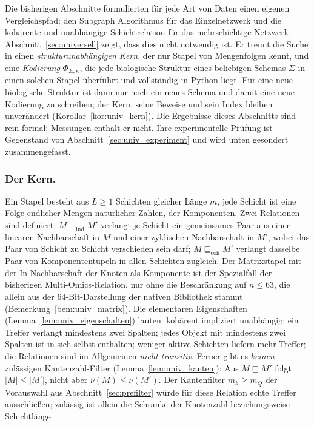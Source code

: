 \documentclass[a4paper,12pt, twoside]{report}
\theoremstyle{definition}
\begin{document}
Die bisherigen Abschnitte formulierten für jede Art von Daten einen eigenen Vergleichspfad: den Subgraph Algorithmus für das Einzelnetzwerk und die kohärente und unabhängige Schichtrelation für das mehrschichtige Netzwerk. Abschnitt~\ref{sec:universell} zeigt, dass dies nicht notwendig ist. Er trennt die Suche in einen \emph{strukturunabhängigen Kern}, der nur Stapel von Mengenfolgen kennt, und eine \emph{Kodierung} $\Phi_{\Sigma,\kappa}$, die jede biologische Struktur eines beliebigen Schemas $\Sigma$ in einen solchen Stapel überführt und vollständig in Python liegt. Für eine neue biologische Struktur ist dann nur noch ein neues Schema und damit eine neue Kodierung zu schreiben; der Kern, seine Beweise und sein Index bleiben unverändert (Korollar~\ref{kor:univ_kern}). Die Ergebnisse dieses Abschnitts sind rein formal; Messungen enthält er nicht. Ihre experimentelle Prüfung ist Gegenstand von Abschnitt~\ref{sec:univ_experiment} und wird unten gesondert zusammengefasst.

\subsubsection{Der Kern.} Ein Stapel besteht aus $L\ge1$ Schichten gleicher Länge $m$, jede Schicht ist eine Folge endlicher Mengen natürlicher Zahlen, der Komponenten. Zwei Relationen sind definiert: $M\sqsubseteq_{\mathrm{ind}}M'$ verlangt je Schicht ein gemeinsames Paar aus einer linearen Nachbarschaft in $M$ und einer zyklischen Nachbarschaft in $M'$, wobei das Paar von Schicht zu Schicht verschieden sein darf; $M\sqsubseteq_{\mathrm{coh}}M'$ verlangt dasselbe Paar von Komponententupeln in allen Schichten zugleich. Der Matrixstapel mit der In-Nachbarschaft der Knoten als Komponente ist der Spezialfall der bisherigen Multi-Omics-Relation, nur ohne die Beschränkung auf $n\le63$, die allein aus der 64-Bit-Darstellung der nativen Bibliothek stammt (Bemerkung~\ref{bem:univ_matrix}). Die elementaren Eigenschaften (Lemma~\ref{lem:univ_eigenschaften}) lauten: kohärent impliziert unabhängig; ein Treffer verlangt mindestens zwei Spalten; jedes Objekt mit mindestens zwei Spalten ist in sich selbst enthalten; weniger aktive Schichten liefern mehr Treffer; die Relationen sind im Allgemeinen \emph{nicht transitiv}. Ferner gibt es \emph{keinen} zulässigen Kantenzahl-Filter (Lemma~\ref{lem:univ_kanten}): Aus $M\sqsubseteq M'$ folgt $|M|\le|M'|$, nicht aber $\nu(M)\le\nu(M')$. Der Kantenfilter $m_k\ge m_Q$ der Vorauswahl aus Abschnitt~\ref{sec:prefilter} würde für diese Relation echte Treffer ausschließen; zulässig ist allein die Schranke der Knotenzahl beziehungsweise Schichtlänge.
\end{document}
